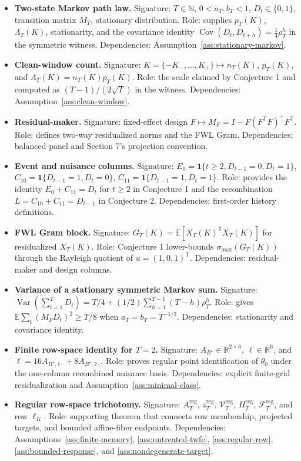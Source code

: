 \documentclass[11pt]{article}
\newcommand{\E}{\mathbb{E}}
\newcommand{\one}{\mathbf{1}}
\newcommand{\transpose}{\mathsf{T}}
\theoremstyle{definition}
\theoremstyle{plain}
\theoremstyle{remark}
\begin{document}
\begin{itemize}[leftmargin=*]
\item \textbf{Two-state Markov path law.} Signature: \(T\in\mathbb N\), \(0<a_T,b_T<1\), \(D_t\in\{0,1\}\), transition matrix \(M_T\), stationary distribution. Role: supplies \(p_T(K)\), \(\Lambda_T(K)\), stationarity, and the covariance identity \(\operatorname{Cov}(D_t,D_{t+h})=\frac14\rho_T^h\) in the symmetric witness. Dependencies: Assumption~\ref{ass:stationary-markov}.
\item \textbf{Clean-window count.} Signature: \(K=\{-K_-,\ldots,K_+\}\mapsto n_T(K)\), \(p_T(K)\), and \(\Lambda_T(K)=n_T(K)p_T(K)\). Role: the scale claimed by Conjecture 1 and computed as \((T-1)/(2\sqrt T)\) in the witness. Dependencies: Assumption~\ref{ass:clean-window}.
\item \textbf{Residual-maker.} Signature: fixed-effect design \(F\mapsto M_F=I-F(F^\transpose F)^+F^\transpose\). Role: defines two-way residualized norms and the FWL Gram. Dependencies: balanced panel and Section 7's projection convention.
\item \textbf{Event and nuisance columns.} Signature: \(E_0=\one\{t\ge2,D_{t-1}=0,D_t=1\}\), \(C_{10}=\one\{D_{t-1}=1,D_t=0\}\), \(C_{11}=\one\{D_{t-1}=1,D_t=1\}\). Role: provides the identity \(E_0+C_{11}=D_t\) for \(t\ge2\) in Conjecture 1 and the recombination \(L=C_{10}+C_{11}=D_{t-1}\) in Conjecture 2. Dependencies: first-order history definitions.
\item \textbf{FWL Gram block.} Signature: \(G_T(K)=\E[X_T(K)^\transpose X_T(K)]\) for residualized \(X_T(K)\). Role: Conjecture 1 lower-bounds \(\sigma_{\max}(G_T(K))\) through the Rayleigh quotient of \(u=(1,0,1)^\transpose\). Dependencies: residual-maker and design columns.
\item \textbf{Variance of a stationary symmetric Markov sum.} Signature: \(\operatorname{Var}(\sum_{t=1}^T D_t)=T/4+(1/2)\sum_{h=1}^{T-1}(T-h)\rho_T^h\). Role: gives \(\E\sum_t(M_FD_t)^2\ge T/8\) when \(a_T=b_T=T^{-1/2}\). Dependencies: stationarity and covariance identity.
\item \textbf{Finite row-space identity for \(T=2\).} Signature: \(A_{B^\star}\in\mathbb R^{2\times 6}\), \(\ell\in\mathbb R^6\), and \(\ell=16A_{B^\star,1\cdot}+8A_{B^\star,2\cdot}\). Role: proves regular point identification of \(\theta_0\) under the one-column recombined nuisance basis. Dependencies: explicit finite-grid residualization and Assumption~\ref{ass:minimal-class}.
\item \textbf{Regular row-space trichotomy.} Signature: \(A_T^{\mathrm{reg}}\), \(z_T^{\mathrm{reg}}\), \(\mathcal V_T^{\mathrm{reg}}\), \(\Pi_T^{\mathrm{reg}}\), \(\mathcal F_T^{\mathrm{reg}}\), and row \(\ell_K\). Role: supporting theorem that connects row membership, projected targets, and bounded affine-fiber endpoints. Dependencies: Assumptions~\ref{ass:finite-memory}, \ref{ass:untreated-twfe}, \ref{ass:regular-row}, \ref{ass:bounded-response}, and \ref{ass:nondegenerate-target}.
\end{itemize}
\end{document}
